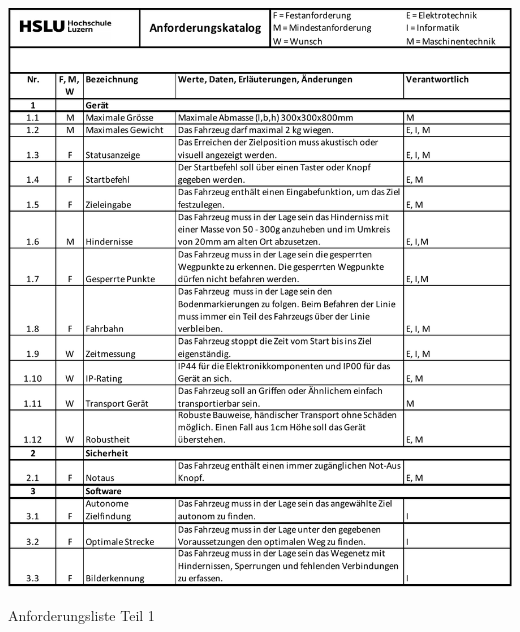 \begin{table}[H]
\centering
\includegraphics[width=\textwidth]{assets/projektmanagement/Anforderungsliste_V1.01_page1.pdf}
\caption{Anforderungsliste Teil 1}
\label{table:anforderungsliste_page1}
\end{table}
\newpage

